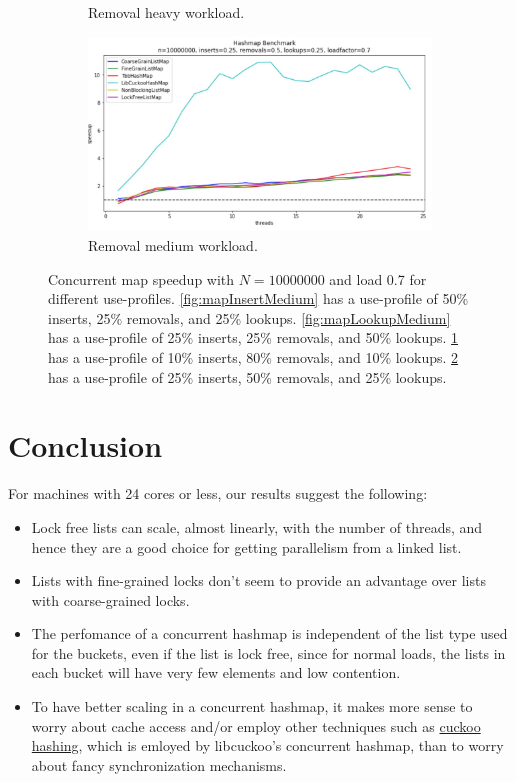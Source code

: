 \documentclass[11pt]{article}
\begin{document}
\begin{figure}[h]
\begin{subfigure}{0.5\textwidth}
  \caption{Removal heavy workload.}
  \label{fig:mapRemovalHeavy}
\end{subfigure}%
\hspace*{\fill}
\begin{subfigure}{.5\textwidth}
  \centering
  \includegraphics[width=1.0\linewidth]{figs/patricio/latedays/removals_medium.jpg}
  \caption{Removal medium workload.}
  \label{fig:mapRemoveMedium}
\end{subfigure}
\caption{
Concurrent map speedup with $N=10000000$ and load 0.7 for different use-profiles.
\ref{fig:mapInsertMedium} has a use-profile of 50\% inserts, 25\% removals, and
25\% lookups. \ref{fig:mapLookupMedium} has a use-profile of 25\% inserts, 25\%
removals, and 50\% lookups. \ref{fig:mapRemovalHeavy} has a use-profile of 10\%
inserts, 80\% removals, and 10\% lookups. \ref{fig:mapRemoveMedium} has a
use-profile of 25\% inserts, 50\% removals, and 25\% lookups.
}
\label{fig:restofMaps}
\end{figure}


\section{Conclusion}
For machines with 24 cores or less, our results suggest the following:
\begin{itemize}
\item
Lock free lists can scale, almost linearly, with the number of threads, and
hence they are a good choice for getting parallelism from a linked list.
\item
Lists with fine-grained locks don't seem to provide an advantage over lists with
coarse-grained locks.
\item
The perfomance of a concurrent hashmap is independent of the list type used 
for the buckets, even if the list is lock free, since for normal loads, the lists
in each bucket will have very few elements and low contention.
\item
To have better scaling in a concurrent hashmap, it makes more sense to worry about
cache access and/or employ other techniques such as
\href{https://en.wikipedia.org/wiki/Cuckoo_hashing}{cuckoo hashing}, which is
emloyed by libcuckoo's concurrent hashmap, than to worry about fancy synchronization
mechanisms.
\end{itemize}
\end{document}
